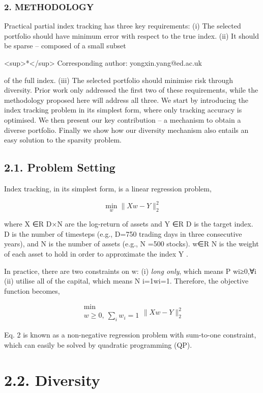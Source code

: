 \documentclass{article}
\begin{document}
\subsubsection{2. METHODOLOGY}

Practical partial index tracking has three key requirements: (i) The selected portfolio should have minimum error with respect to the true index. (ii) It should be sparse – composed of a small subset

<sup>*</sup> Corresponding author: yongxin.yang@ed.ac.uk

of the full index. (iii) The selected portfolio should minimise risk through diversity. Prior work only addressed the first two of these requirements, while the methodology proposed here will address all three. We start by introducing the index tracking problem in its simplest form, where only tracking accuracy is optimised. We then present our key contribution – a mechanism to obtain a diverse portfolio. Finally we show how our diversity mechanism also entails an easy solution to the sparsity problem.

\subsection{2.1. Problem Setting}

Index tracking, in its simplest form, is a linear regression problem,

$$\operatorname*{min}_{w}\|Xw-Y\|_{2}^{2}\tag{1}$$

where X ∈R D×N are the log-return of assets and Y ∈R D is the target index. D is the number of timesteps (e.g., D=750 trading days in three consecutive years), and N is the number of assets (e.g., N =500 stocks). w∈R N is the weight of each asset to hold in order to approximate the index Y .

In practice, there are two constraints on w: (i) \textit{long only}, which means P wi≥0,∀i (ii) utilise all of the capital, which means N i=1wi=1. Therefore, the objective function becomes,

$$\begin{array}{c}\min\\ w\geq0,\ \sum_{i}w_{i}=1\end{array}\|Xw-Y\|_{2}^{2}\tag{2}$$

Eq. 2 is known as a non-negative regression problem with sum-to-one constraint, which can easily be solved by quadratic programming (QP).

\section{2.2. Diversity}
\end{document}
